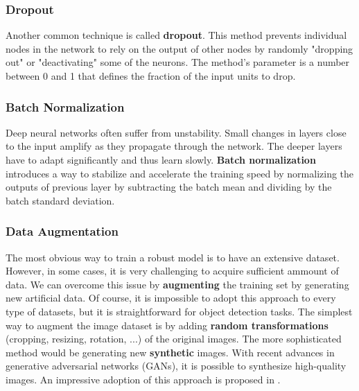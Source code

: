 \subsubsection{Dropout}
Another common technique is called \textbf{dropout}. This method prevents
individual nodes in the network to rely on the output of other nodes by randomly
"dropping out" or "deactivating" some of the neurons. The method's parameter is
a number between 0 and 1 that defines the fraction of the input units to drop.

\subsubsection{Batch Normalization}
Deep neural networks often suffer from unstability. Small changes in layers
close to the input amplify as they propagate through the network. The deeper
layers have to adapt significantly and thus learn slowly.
\textbf{Batch normalization} introduces a way to stabilize and accelerate the
training speed by normalizing the outputs of previous layer by subtracting the
batch mean and dividing by the batch standard deviation.

\subsubsection{Data Augmentation}
The most obvious way to train a robust model is to have an extensive dataset.
However, in some cases, it is very challenging to acquire sufficient ammount of
data. We can overcome this issue by
\textbf{augmenting} the training set by generating new artificial data. Of
course, it is impossible to adopt this approach to every type of datasets, but
it is straightforward for object detection tasks. The simplest way to augment
the image dataset is by adding \textbf{random transformations} (cropping,
resizing, rotation, ...) of the original images. The more sophisticated method
would be generating new \textbf{synthetic} images. With recent advances in
generative adversarial networks (GANs), it is possible to synthesize
high-quality images. An impressive adoption of this approach is proposed in
\cite{wei2019generative}.